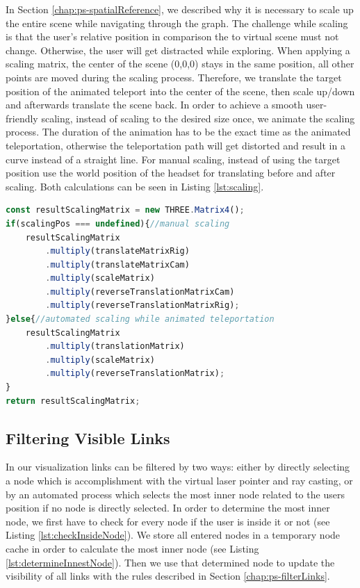 In Section \ref{chap:ps-spatialReference}, we described why it is necessary to scale up the entire scene while navigating through the graph. 
The challenge while scaling is that the user's relative position in comparison the to virtual scene must not change. Otherwise, the user will get distracted while exploring.
When applying a scaling matrix, the center of the scene (0,0,0) stays in the same position, all other points are moved during the scaling process. 
Therefore, we translate the target position of the animated teleport into the center of the scene, then scale up/down and afterwards translate the scene back.
In order to achieve a smooth user-friendly scaling, instead of scaling to the desired size once, we animate the scaling process. The duration of the animation has to be the exact time as the animated teleportation, otherwise the teleportation path will get distorted and result in a curve instead of a straight line.
For manual scaling, instead of using the target position use the world position of the headset for translating before and after scaling. Both calculations can be seen in Listing \ref{lst:scaling}.
\pagebreak

\begin{lstlisting}[language=JavaScript,label={lst:scaling},caption=Simplified algorithm for calculating the scaling matrix]
const resultScalingMatrix = new THREE.Matrix4();
if(scalingPos === undefined){//manual scaling
    resultScalingMatrix
        .multiply(translateMatrixRig)
        .multiply(translateMatrixCam)
        .multiply(scaleMatrix)
        .multiply(reverseTranslationMatrixCam)
        .multiply(reverseTranslationMatrixRig);
}else{//automated scaling while animated teleportation
    resultScalingMatrix
        .multiply(translationMatrix)
        .multiply(scaleMatrix)
        .multiply(reverseTranslationMatrix);
}
return resultScalingMatrix;
\end{lstlisting}

\subsection{Filtering Visible Links}
\label{sec:linkFiltering}

In our visualization links can be filtered by two ways: either by directly selecting a node which is accomplishment with the virtual laser pointer and ray casting, or by an automated process which selects the most inner node related to the users position if no node is directly selected.
In order to determine the most inner node, we first have to check for every node if the user is inside it or not (see Listing \ref{lst:checkInsideNode}). We store all entered nodes in a temporary node cache in order to calculate the most inner node (see Listing \ref{lst:determineInnestNode}).
Then we use that determined node to update the visibility of all links with the rules described in Section \ref{chap:ps-filterLinks}.


